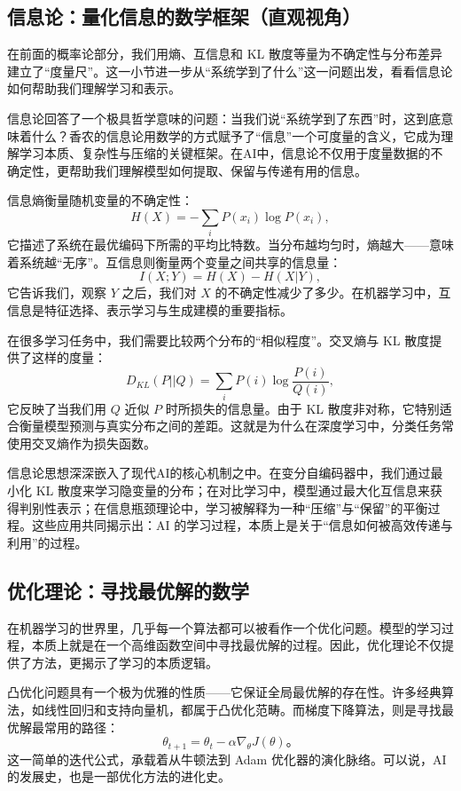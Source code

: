 \subsection{信息论：量化信息的数学框架（直观视角）}

在前面的概率论部分，我们用熵、互信息和 KL 散度等量为不确定性与分布差异建立了“度量尺”。这一小节进一步从“系统学到了什么”这一问题出发，看看信息论如何帮助我们理解学习和表示。

信息论回答了一个极具哲学意味的问题：当我们说“系统学到了东西”时，这到底意味着什么？香农的信息论用数学的方式赋予了“信息”一个可度量的含义，它成为理解学习本质、复杂性与压缩的关键框架。在AI中，信息论不仅用于度量数据的不确定性，更帮助我们理解模型如何提取、保留与传递有用的信息。

信息熵衡量随机变量的不确定性：
$$
H(X) = -\sum_{i} P(x_i) \log P(x_i),
$$
它描述了系统在最优编码下所需的平均比特数。当分布越均匀时，熵越大——意味着系统越“无序”。互信息则衡量两个变量之间共享的信息量：
$$
I(X;Y) = H(X) - H(X|Y),
$$
它告诉我们，观察 $Y$ 之后，我们对 $X$ 的不确定性减少了多少。在机器学习中，互信息是特征选择、表示学习与生成建模的重要指标。

在很多学习任务中，我们需要比较两个分布的“相似程度”。交叉熵与 KL 散度提供了这样的度量：
$$
D_{KL}(P||Q) = \sum_i P(i)\log\frac{P(i)}{Q(i)},
$$
它反映了当我们用 $Q$ 近似 $P$ 时所损失的信息量。由于 KL 散度非对称，它特别适合衡量模型预测与真实分布之间的差距。这就是为什么在深度学习中，分类任务常使用交叉熵作为损失函数。

信息论思想深深嵌入了现代AI的核心机制之中。在变分自编码器中，我们通过最小化 KL 散度来学习隐变量的分布；在对比学习中，模型通过最大化互信息来获得判别性表示；在信息瓶颈理论中，学习被解释为一种“压缩”与“保留”的平衡过程。这些应用共同揭示出：AI 的学习过程，本质上是关于“信息如何被高效传递与利用”的过程。

\subsection{优化理论：寻找最优解的数学}

在机器学习的世界里，几乎每一个算法都可以被看作一个优化问题。模型的学习过程，本质上就是在一个高维函数空间中寻找最优解的过程。因此，优化理论不仅提供了方法，更揭示了学习的本质逻辑。

凸优化问题具有一个极为优雅的性质——它保证全局最优解的存在性。许多经典算法，如线性回归和支持向量机，都属于凸优化范畴。而梯度下降算法，则是寻找最优解最常用的路径：
$$
\theta_{t+1} = \theta_t - \alpha \nabla_\theta J(\theta)。
$$
这一简单的迭代公式，承载着从牛顿法到 Adam 优化器的演化脉络。可以说，AI 的发展史，也是一部优化方法的进化史。

